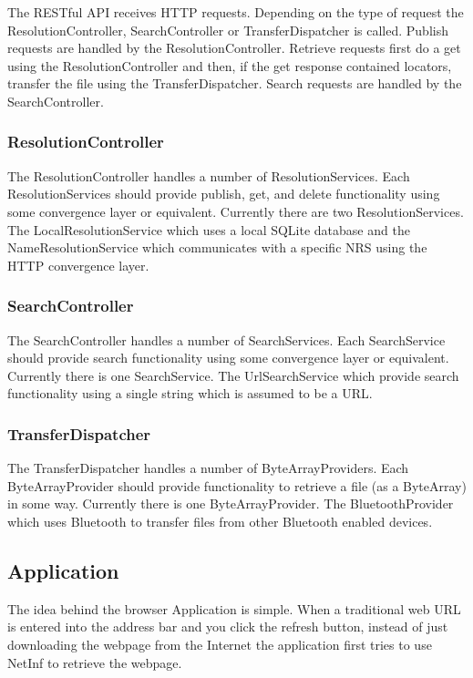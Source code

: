\documentclass[10pt,a4paper]{article}
\begin{document}
The RESTful API receives HTTP requests. Depending on the type of request the ResolutionController, SearchController or TransferDispatcher is called. Publish requests are handled by the ResolutionController. Retrieve requests first do a get using the ResolutionController and then, if the get response contained locators, transfer the file using the TransferDispatcher. Search requests are handled by the SearchController.


\subsubsection{ResolutionController}

The ResolutionController handles a number of ResolutionServices. Each ResolutionServices should provide publish, get, and delete functionality using some convergence layer or equivalent. Currently there are two ResolutionServices. The LocalResolutionService which uses a local SQLite database and the NameResolutionService which communicates with a specific NRS using the HTTP convergence layer.

\subsubsection{SearchController}

The SearchController handles a number of SearchServices. Each SearchService should provide search functionality using some convergence layer or equivalent. Currently there is one SearchService. The UrlSearchService which provide search functionality using a single string which is assumed to be a URL.

\subsubsection{TransferDispatcher}

The TransferDispatcher handles a number of ByteArrayProviders. Each ByteArrayProvider should provide functionality to retrieve a file (as a ByteArray) in some way. Currently there is one ByteArrayProvider. The BluetoothProvider which uses Bluetooth to transfer files from other Bluetooth enabled devices.

\subsection{Application}

The idea behind the browser Application is simple. When a traditional web URL is entered into the address bar and you click the refresh button, instead of just downloading the webpage from the Internet the application first tries to use NetInf to retrieve the webpage.
\end{document}
